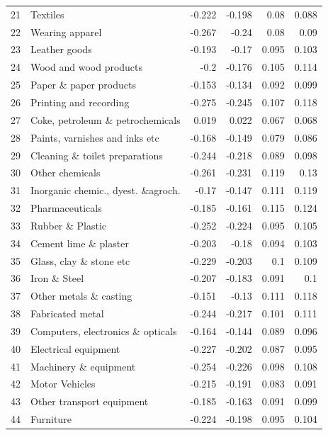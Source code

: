 \begin{longtable}{@{\extracolsep{\fill}}rlrrrr@{}}
    21    & Textiles & -0.222 & -0.198 & 0.08  & 0.088 \\
    22    & Wearing apparel & -0.267 & -0.24 & 0.08  & 0.09 \\
    23    & Leather goods & -0.193 & -0.17 & 0.095 & 0.103 \\
    24    & Wood and wood products & -0.2  & -0.176 & 0.105 & 0.114 \\
    25    & Paper \& paper products & -0.153 & -0.134 & 0.092 & 0.099 \\
    26    & Printing and recording & -0.275 & -0.245 & 0.107 & 0.118 \\
    27    & Coke, petroleum \& petrochemicals & 0.019 & 0.022 & 0.067 & 0.068 \\
    28    & Paints, varnishes and inks etc & -0.168 & -0.149 & 0.079 & 0.086 \\
    29    & Cleaning \& toilet preparations & -0.244 & -0.218 & 0.089 & 0.098 \\
    30    & Other chemicals & -0.261 & -0.231 & 0.119 & 0.13 \\
    31    & Inorganic chemic., dyest. \&agroch. & -0.17 & -0.147 & 0.111 & 0.119 \\
    32    & Pharmaceuticals & -0.185 & -0.161 & 0.115 & 0.124 \\
    33    & Rubber \& Plastic & -0.252 & -0.224 & 0.095 & 0.105 \\
    34    & Cement lime \& plaster & -0.203 & -0.18 & 0.094 & 0.103 \\
    35    & Glass, clay \& stone etc & -0.229 & -0.203 & 0.1   & 0.109 \\
    36    & Iron \& Steel & -0.207 & -0.183 & 0.091 & 0.1 \\
    37    & Other metals \& casting & -0.151 & -0.13 & 0.111 & 0.118 \\
    38    & Fabricated metal & -0.244 & -0.217 & 0.101 & 0.111 \\
    39    & Computers, electronics \& opticals & -0.164 & -0.144 & 0.089 & 0.096 \\
    40    & Electrical equipment & -0.227 & -0.202 & 0.087 & 0.095 \\
    41    & Machinery \& equipment & -0.254 & -0.226 & 0.098 & 0.108 \\
    42    & Motor Vehicles & -0.215 & -0.191 & 0.083 & 0.091 \\
    43    & Other transport equipment & -0.185 & -0.163 & 0.091 & 0.099 \\
    44    & Furniture & -0.224 & -0.198 & 0.095 & 0.104 \\

\end{longtable}
